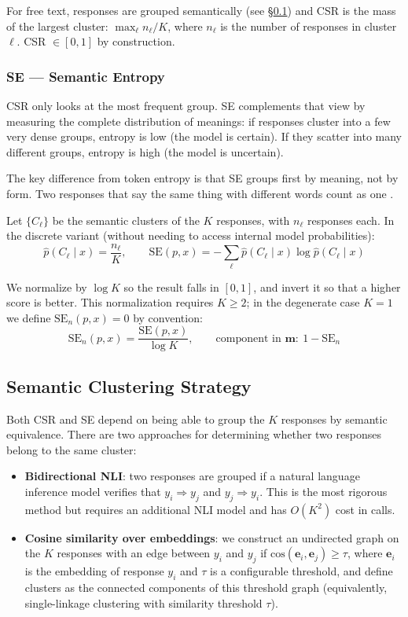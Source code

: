 \documentclass[11pt,a4paper]{article}
\begin{document}
For free text, responses are grouped semantically (see \S\ref{sec:clustering}) and CSR is the mass of the largest cluster: $\max_{\ell} n_\ell / K$, where $n_\ell$ is the number of responses in cluster $\ell$. CSR $\in [0, 1]$ by construction.

\subsubsection{SE — Semantic Entropy}

CSR only looks at the most frequent group. SE complements that view by measuring the complete distribution of meanings: if responses cluster into a few very dense groups, entropy is low (the model is certain). If they scatter into many different groups, entropy is high (the model is uncertain).

The key difference from token entropy is that SE groups first by meaning, not by form. Two responses that say the same thing with different words count as one \citep{semanticentropy2024}.

Let $\{C_\ell\}$ be the semantic clusters of the $K$ responses, with $n_\ell$ responses each. In the discrete variant (without needing to access internal model probabilities):
\[
\hat{p}(C_\ell \mid x) = \frac{n_\ell}{K}, \qquad
\mathrm{SE}(p, x) = -\sum_{\ell} \hat{p}(C_\ell \mid x) \log \hat{p}(C_\ell \mid x)
\]

We normalize by $\log K$ so the result falls in $[0, 1]$, and invert it so that a higher score is better. This normalization requires $K \geq 2$; in the degenerate case $K = 1$ we define $\mathrm{SE}_n(p, x) = 0$ by convention:
\[
\mathrm{SE}_n(p, x) = \frac{\mathrm{SE}(p, x)}{\log K}, \qquad \text{component in } \mathbf{m}: \ 1 - \mathrm{SE}_n
\]

\subsection{Semantic Clustering Strategy}
\label{sec:clustering}

Both CSR and SE depend on being able to group the $K$ responses by semantic equivalence. There are two approaches for determining whether two responses belong to the same cluster:

\begin{itemize}[noitemsep]
    \item \textbf{Bidirectional NLI}: two responses are grouped if a natural language inference model verifies that $y_i \Rightarrow y_j$ and $y_j \Rightarrow y_i$. This is the most rigorous method but requires an additional NLI model and has $O(K^2)$ cost in calls.
    \item \textbf{Cosine similarity over embeddings}: we construct an undirected graph on the $K$ responses with an edge between $y_i$ and $y_j$ if $\mathrm{cos}(\mathbf{e}_i, \mathbf{e}_j) \geq \tau$, where $\mathbf{e}_i$ is the embedding of response $y_i$ and $\tau$ is a configurable threshold, and define clusters as the connected components of this threshold graph (equivalently, single-linkage clustering with similarity threshold $\tau$).
\end{itemize}
\end{document}
